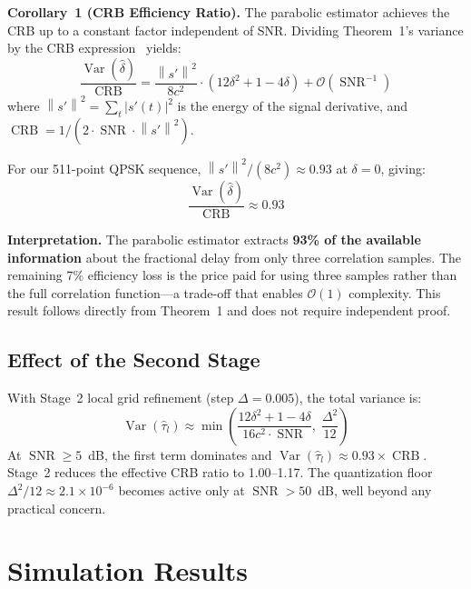 \documentclass[journal]{IEEEtran}
\DeclareMathOperator{\Var}{Var}
\DeclareMathOperator{\SNR}{SNR}
\DeclareMathOperator{\CRB}{CRB}
\newcommand{\bigO}{\mathcal{O}}
\newcommand{\norm}[1]{\left\lVert #1 \right\rVert}
\begin{document}
\textbf{Corollary~1 (CRB Efficiency Ratio).} The parabolic estimator achieves the CRB up to a constant factor independent of SNR. Dividing Theorem~1's variance by the CRB expression~\cite{kay1993} yields:
\begin{equation}
\frac{\Var(\hat{\delta})}{\CRB} = \frac{\norm{s'}^2}{8c^2} \cdot (12\delta^2 + 1 - 4\delta) + \bigO(\SNR^{-1})
\label{eq:cor1}
\end{equation}
where $\norm{s'}^2 = \sum_t |s'(t)|^2$ is the energy of the signal derivative, and $\CRB = 1/(2 \cdot \SNR \cdot \norm{s'}^2)$.

For our 511-point QPSK sequence, $\norm{s'}^2/(8c^2) \approx 0.93$ at $\delta = 0$, giving:
\begin{equation}
\frac{\Var(\hat{\delta})}{\CRB} \approx \mathbf{0.93}
\end{equation}

\textbf{Interpretation.} The parabolic estimator extracts \textbf{93\% of the available information} about the fractional delay from only three correlation samples. The remaining 7\% efficiency loss is the price paid for using three samples rather than the full correlation function---a trade-off that enables $\bigO(1)$ complexity. This result follows directly from Theorem~1 and does not require independent proof.

\subsection{Effect of the Second Stage}

With Stage~2 local grid refinement (step $\Delta = 0.005$), the total variance is:
\begin{equation}
\Var(\hat{\tau}_l) \approx \min\!\left( \frac{12\delta^2 + 1 - 4\delta}{16c^2 \cdot \SNR}, \; \frac{\Delta^2}{12} \right)
\label{eq:combined}
\end{equation}
At $\SNR \ge 5$~dB, the first term dominates and $\Var(\hat{\tau}_l) \approx 0.93 \times \CRB$. Stage~2 reduces the effective CRB ratio to 1.00--1.17. The quantization floor $\Delta^2/12 \approx 2.1 \times 10^{-6}$ becomes active only at $\SNR > 50$~dB, well beyond any practical concern.

\section{Simulation Results}
\label{sec:results}
\end{document}
